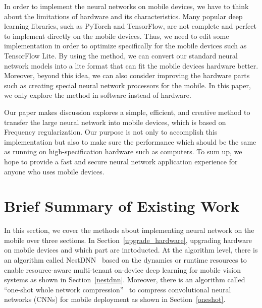 \documentclass{article}
\begin{document}
In order to implement the neural networks on mobile devices, we have to think about the limitations of hardware and its characteristics. Many popular deep learning libraries, such as PyTorch and TensorFlow, are not complete and perfect to implement directly on the mobile devices. Thus, we need to edit some implementation in order to optimize specifically for the mobile devices such as TensorFlow Lite. By using the method, we can convert our standard neural network models into a lite format that can fit the mobile devices hardware better. Moreover, beyond this idea, we can also consider improving the hardware parts such as creating special neural network processors for the mobile. In this paper, we only explore the method in software instead of hardware.

Our paper makes discussion explores a simple, efficient, and creative method to transfer the large neural network into mobile devices, which is based on Frequency regularization. Our purpose is not only to accomplish this implementation but also to make sure the performance which should be the same as running on high-specification hardware such as computers. To sum up, we hope to provide a fast and secure neural network application experience for anyone who uses mobile devices.



\section*{Brief Summary of Existing Work}

In this section, we cover the methods about implementing neural network on the mobile over three sections. In Section~\ref{upgrade_hardware}, upgrading hardware on mobile devices and which part are inrtoducted. At the algorithm level, there is an algorithm called NestDNN~\cite{fang2018nestdnn} based on the dynamics or runtime resources to enable resource-aware multi-tenant on-device deep learning for mobile vision systems as shown in Section~\ref{nestdnn}. Moreover, there is an algorithm called “one-shot whole network compression”~\cite{kim2016compression} to compress convolutional neural networks (CNNs) for mobile deployment as shown in Section~\ref{oneshot}.
\end{document}
